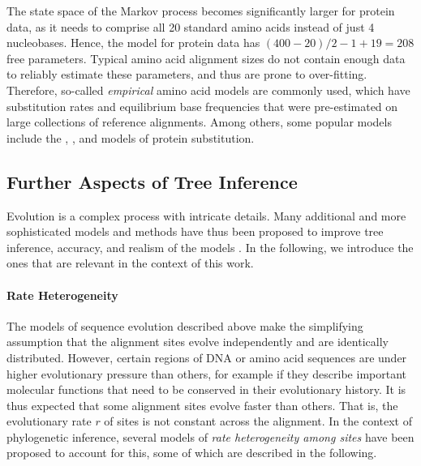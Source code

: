 The state space of the Markov process becomes significantly larger for protein data,
as it needs to comprise all \num{20} standard amino acids instead of just \num{4} nucleobases.
Hence, the  model for protein data has $(400 - 20) / 2 - 1 + 19 = 208$ free parameters.
Typical amino acid alignment sizes do not contain enough data to reliably estimate these parameters,
and thus are prone to over-fitting.
Therefore, so-called \emph{empirical} amino acid models are commonly used,
which have substitution rates and equilibrium base frequencies
that were pre-estimated on large collections of reference alignments.
Among others, some popular models include the  \cite{Dayhoff1978},
 \cite{Whelan2001}, and  \cite{Le2008} models of protein substitution.


\subsection{Further Aspects of Tree Inference}
\label{ch:Foundations:sec:MLTreeInference:sub:FurtherAspects}

Evolution is a complex process with intricate details.
Many additional and more sophisticated models and methods have thus been proposed
to improve tree inference, accuracy, and realism of the models \cite{Yang2014}.
In the following, we introduce the ones that are relevant in the context of this work.

\paragraph{Rate Heterogeneity}
\label{ch:Foundations:sec:MLTreeInference:sub:FurtherAspects:par:RateHeterogeneity}

The models of sequence evolution described above make the simplifying assumption
that the alignment sites evolve independently and are identically distributed.
However, certain regions of DNA or amino acid sequences are under higher evolutionary pressure than others,
for example if they describe important molecular functions that need to be conserved in their evolutionary history.
It is thus expected that some alignment sites evolve faster than others.
That is, the evolutionary rate $r$ of sites is not constant across the alignment.
In the context of phylogenetic inference,
several models of \emph{rate heterogeneity among sites} have been proposed to account for this,
some of which are described in the following.


